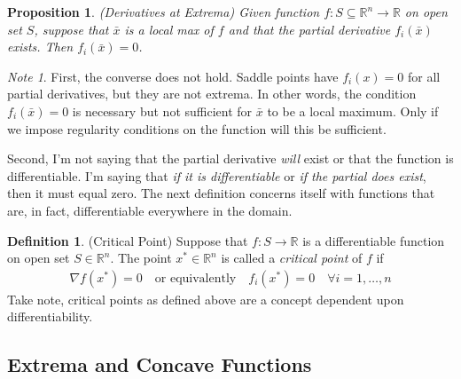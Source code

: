 \documentclass[12pt]{article}
\numberwithin{equation}{section} %
\theoremstyle{plain}
\newtheorem{prop}[thm]{Proposition}
\theoremstyle{definition}
\newtheorem{defn}[thm]{Definition}
\theoremstyle{remark}
\newtheorem*{note}{Note}
\newcommand{\R}{\mathbb{R}}
\newcommand{\Rn}{\mathbb{R}^n}
\begin{document}
\begin{prop}{\emph{(Derivatives at Extrema)}}
Given function $f:S\subseteq \Rn\rightarrow \R$ on open set $S$, suppose
that $\bar{x}$ is a local max of $f$ and that the partial derivative
$f_i(\bar{x})$ exists.  Then $f_{i}(\bar{x})=0$.
\end{prop}

\begin{note}
First, the converse does not hold. Saddle points have $f_i(x)=0$ for all
partial derivatives, but they are not extrema. In other words, the
condition $f_i(\bar{x})=0$ is necessary but not sufficient for $\bar{x}$
to be a local maximum. Only if we impose regularity conditions on the
function will this be sufficient.

Second, I'm not saying that the partial derivative \emph{will} exist or
that the function is differentiable. I'm saying that \emph{if it is
differentiable} or \emph{if the partial does exist}, then it must equal
zero.
The next definition concerns itself with functions that are, in
fact, differentiable everywhere in the domain.
\end{note}

\begin{defn}{(Critical Point)}
Suppose that $f:S\rightarrow\R$ is a differentiable function on open set
$S\in\Rn$. The point $x^*\in\Rn$ is called a \emph{critical
point} of $f$ if
\begin{align*}
  \nabla f(x^*) = 0
  \quad\text{or equivalently}\quad
  f_i(x^*)=0
  \quad\forall i=1,\ldots,n
\end{align*}
Take note, critical points as defined above are a concept dependent upon
differentiability.
\end{defn}

\subsection{Extrema and Concave Functions}
\label{sec:extrema-concave}
\end{document}
